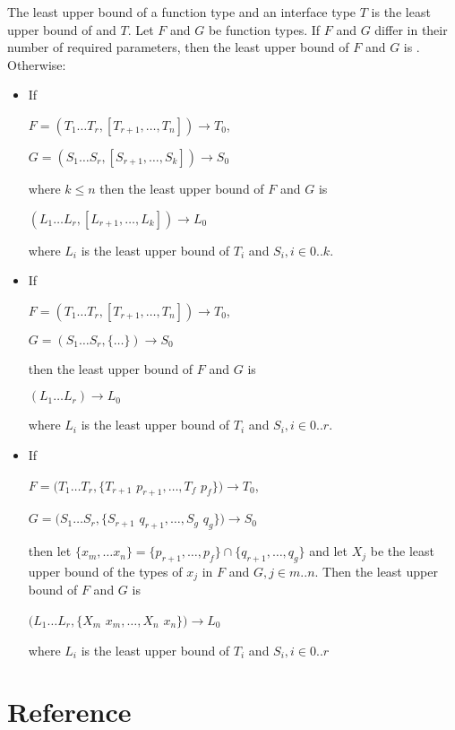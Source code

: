 \documentclass{article}
\begin{document}
\LMHash{}
The least upper bound of a function type and an interface type $T$ is the least upper bound of  and $T$.
Let $F$ and $G$ be function types. If $F$ and $G$ differ in their number of required parameters, then the least upper bound of $F$ and $G$ is .  Otherwise:
\begin{itemize}
\item If 

$F= (T_1 \ldots T_r, [T_{r+1}, \ldots, T_n]) \longrightarrow T_0$, 

$G= (S_1 \ldots S_r, [S_{r+1}, \ldots, S_k]) \longrightarrow S_0$ 

where $k \le n$ then the least upper bound of $F$ and $G$ is 

$(L_1 \ldots L_r, [L_{r+1}, \ldots, L_k]) \longrightarrow L_0$ 

where $L_i$ is the least upper bound of $T_i$ and $S_i, i \in 0..k$.
\item If 

$F= (T_1 \ldots T_r, [T_{r+1}, \ldots, T_n]) \longrightarrow T_0$,

$G= (S_1 \ldots S_r, \{ \ldots \}) \longrightarrow S_0$ 

then the least upper bound of $F$ and $G$ is 

$(L_1 \ldots L_r) \longrightarrow L_0$ 

where $L_i$ 
is the least upper bound of $T_i$ and $S_i, i \in 0..r$.
\item If 

$F= (T_1 \ldots T_r, \{T_{r+1}$  $p_{r+1}, \ldots, T_f$ $p_f\}) \longrightarrow T_0$,  

$G= (S_1 \ldots S_r, \{ S_{r+1}$  $q_{r+1}, \ldots, S_g$ $q_g\}) \longrightarrow S_0$ 

then let $\{x_m, \ldots x_n\}  = \{p_{r+1}, \ldots, p_f\} \cap \{q_{r+1}, \ldots, q_g\}$ and let $X_j$ be the least upper bound of the types of $x_j$ in $F$ and $G, j \in m..n$. Then
the least upper bound of $F$ and $G$ is

$(L_1 \ldots L_r, \{ X_m$ $x_m, \ldots, X_n$ $x_n\}) \longrightarrow L_0$ 

where $L_i$ is the least upper bound of $T_i$ and $S_i, i \in 0..r$ 
\end{itemize}


\section{Reference}
\end{document}
